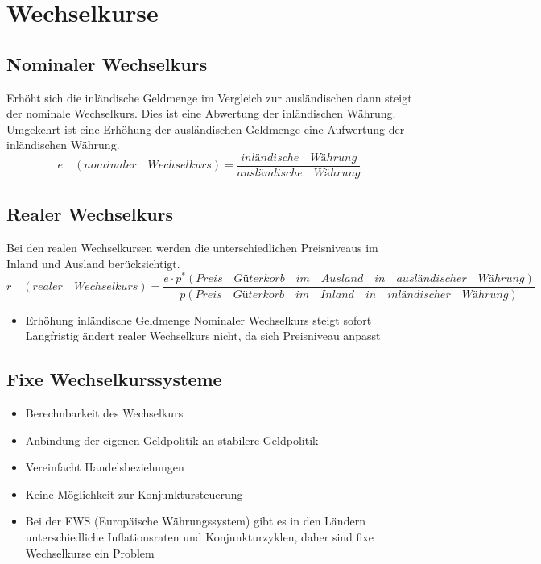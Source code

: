 \section{Wechselkurse}
\subsection{Nominaler Wechselkurs}
Erhöht sich die inländische Geldmenge im Vergleich zur ausländischen dann steigt der nominale Wechselkurs. Dies ist eine Abwertung der inländischen Währung. Umgekehrt ist eine Erhöhung der ausländischen Geldmenge eine Aufwertung der inländischen Währung. 
\begin{equation*}
 e\quad (nominaler\quad Wechselkurs) = \frac{inländische\quad Währung}{ausländische\quad Währung}
\end{equation*}
\subsection{Realer Wechselkurs}
Bei den realen Wechselkursen werden die unterschiedlichen Preisniveaus im Inland und Ausland berücksichtigt.
\begin{equation*}
	r \quad(realer \quad Wechselkurs) = \frac{e \cdot p^{*} (Preis\quad Güterkorb \quad im\quad Ausland\quad in \quad ausländischer \quad Währung)}{p (Preis\quad Güterkorb\quad im\quad Inland\quad in\quad inländischer\quad Währung)}
\end{equation*}
\begin{itemize}
	\item Erhöhung inländische Geldmenge
	\subitem Nominaler Wechselkurs steigt sofort
	\subitem Langfristig ändert realer Wechselkurs nicht, da sich Preisniveau anpasst
\end{itemize}
\subsection{Fixe Wechselkurssysteme}
\begin{itemize}
	\item Berechnbarkeit des Wechselkurs
	\item Anbindung der eigenen Geldpolitik an stabilere Geldpolitik
	\item Vereinfacht Handelsbeziehungen
	\item Keine Möglichkeit zur Konjunktursteuerung
	\item Bei der EWS (Europäische Währungssystem) gibt es in den Ländern unterschiedliche Inflationsraten und Konjunkturzyklen, daher sind fixe Wechselkurse ein Problem
\end{itemize}
